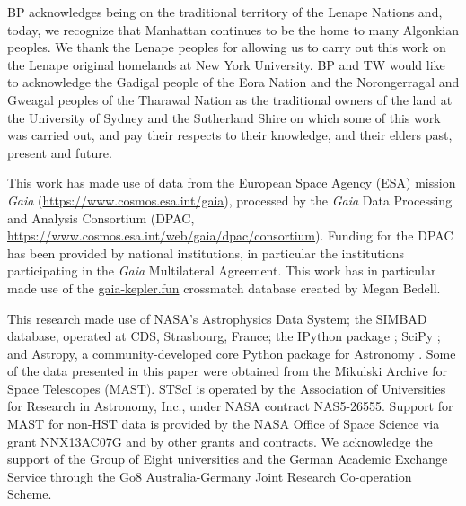 \documentclass[a4paper,fleqn,usenatbib]{mnras}
\begin{document}
BP acknowledges being on the traditional territory of the Lenape Nations and, today, we recognize that Manhattan continues to be the home to many Algonkian peoples. We thank the Lenape peoples for allowing us to carry out this work on the Lenape original homelands at New York University. BP and TW would like to acknowledge the Gadigal people of the Eora Nation and the Norongerragal and Gweagal peoples of the Tharawal Nation as the traditional owners of the land at the University of Sydney and the Sutherland Shire on which some of this work was carried out, and pay their respects to their knowledge, and their elders past, present and future.

This work has made use of data from the European Space Agency (ESA) mission
{\it Gaia} (\url{https://www.cosmos.esa.int/gaia}), processed by the {\it Gaia}
Data Processing and Analysis Consortium (DPAC,
\url{https://www.cosmos.esa.int/web/gaia/dpac/consortium}). Funding for the DPAC
has been provided by national institutions, in particular the institutions
participating in the {\it Gaia} Multilateral Agreement. This work has in particular made use of the \url{gaia-kepler.fun} crossmatch database created by Megan Bedell.

This research made use of NASA's Astrophysics Data System; the SIMBAD database, operated at CDS, Strasbourg, France; the IPython package \citep{PER-GRA:2007}; SciPy \citep{jones_scipy_2001}; and Astropy, a community-developed core Python package for Astronomy \citep{astropy}. Some of the data presented in this paper were obtained from the Mikulski Archive for Space Telescopes (MAST). STScI is operated by the Association of Universities for Research in Astronomy, Inc., under NASA contract NAS5-26555. Support for MAST for non-HST data is provided by the NASA Office of Space Science via grant NNX13AC07G and by other grants and contracts. We acknowledge the support of the Group of Eight universities and the German Academic Exchange Service through the Go8 Australia-Germany Joint Research Co-operation Scheme. 















\bsp	%
\label{lastpage}
\end{document}

